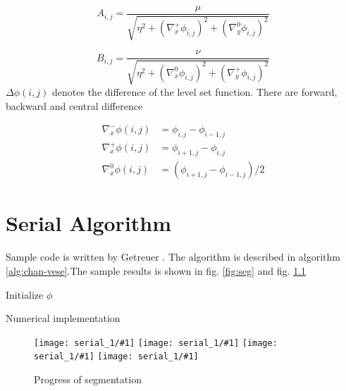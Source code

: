 \begin{equation}
    A_{i, j} = \frac{\mu}
                {\sqrt{\eta^2 
                       + (\nabla_x^+ \phi_{i, j} )^2
                       + (\nabla_y^0 \phi_{i, j} )^2 }
                }
    \label{eq:a}
\end{equation}

\begin{equation}
    B_{i, j} = \frac{\nu}
                    {\sqrt{\eta^2 
                            + (\nabla_x^0 \phi_{i, j} )^2
                            + (\nabla_y^+ \phi_{i, j} )^2 } 
                    }
    \label{eq:b}
\end{equation}
$\Delta \phi(i, j)$ denotes the difference of the level set function. There are forward, backward and central difference

\begin{equation}
    \begin{aligned}
        \nabla_x^- \phi(i, j) &= \phi_{i, j} - \phi_{i-1, j} \\
        \nabla_x^+ \phi(i, j) &= \phi_{i+1, j} - \phi_{i, j} \\
        \nabla_x^0 \phi(i, j) &= (\phi_{i+1, j} - \phi_{i-1, j} ) / 2
    \end{aligned}
\end{equation}

\chapter{Serial Algorithm}
\label{chap:serial}
Sample code is written by Getreuer \cite{Getreuer2012}. The algorithm is described in algorithm \ref{alg:chan-vese}.The sample results is shown in fig. \ref{fig:seg} and fig. \ref*{fig:prog}

\begin{algorithm}[hb]
    \DontPrintSemicolon
    Initialize $\phi$ \;

    \caption{Numerical implementation}
    \label{alg:chan-vese}
\end{algorithm}


\begin{figure}[!htb]
    \centering
    \newcommand{\imgFoxProg}[1]{\texttt{[image: serial\_1/\#1]}}
    \imgFoxProg{1} \imgFoxProg{2} \imgFoxProg{3} \imgFoxProg{4} 
    \caption{Progress of segmentation}
    \label{fig:prog}
\end{figure}
